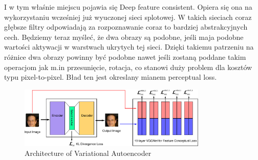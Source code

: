 I w tym właśnie miejscu pojawia się Deep feature consistent. Opiera się ona na wykorzystaniu wcześniej już wyuczonej sieci splotowej. W takich sieciach coraz głębsze filtry odpowiadają za rozpoznawanie coraz to bardziej abstrakcyjnych cech. Będziemy teraz myśleć, że dwa obrazy są podobne, jeśli maja podobne wartości aktywacji w warstwach ukrytych tej sieci. Dzięki takiemu patrzeniu na różnice dwa obrazy powinny być podobne nawet jeśli zostaną poddane takim operacjom jak m.in przesunięcie, rotacja, co stanowi duży problem dla kosztów typu pixel-to-pixel. Bład ten jest okreslany mianem perceptual loss.

\begin{figure}[h!]
    \centering
    \includegraphics[width=0.8\textwidth]{images/dfc_vae}
    \caption{Architecture of Variational Autoencoder}
    \label{fig:dfc_vae}
\end{figure}
